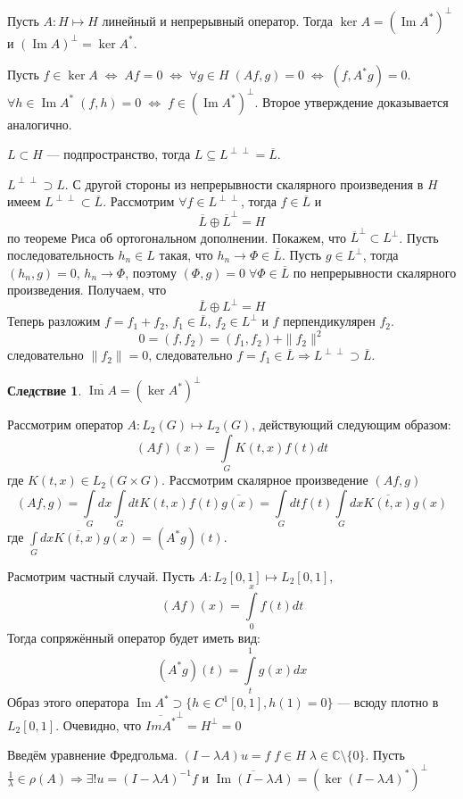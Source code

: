 \documentclass[12pt]{article}
\renewcommand{\Im}{\operatorname{Im}}
\begin{document}
\begin{Theor}[Фредгольма]
    Пусть $A : H \mapsto H$ линейный и непрерывный оператор. Тогда $\ker A = (\Im A^*)^\perp$ и $(\Im A)^\perp = \ker A^*$.
\end{Theor}
\begin{Proof}
Пусть $f \in \ker A\;\Leftrightarrow\;Af = 0\;\Leftrightarrow\;\forall g \in H\;(Af, g) = 0\;\Leftrightarrow\;(f, A^* g) = 0$.
$\forall h \in \Im A^*\;(f, h) = 0\;\Leftrightarrow\;f \in (\Im A^*)^\perp$. Второе утверждение доказывается аналогично.
\end{Proof}

\begin{Utv}
$L \subset H$ --- подпространство, тогда $L \subseteq L^{\perp\perp} = \overline{L}$.
\end{Utv}

\begin{Proof}
    $L^{\perp\perp} \supset L$.
    С другой стороны из непрерывности скалярного произведения в $H$ имеем
    $L^{\perp\perp} \subset \overline{L}$.
    Рассмотрим $\forall f \in L^{\perp\perp}$, тогда $f \in \overline{L}$ и 
    $$
    \overline{L} \oplus \overline{L}^{\perp} = H
    $$ по теореме Риса об ортогональном дополнении.
    Покажем, что $\overline{L}^{\perp} \subset L^{\perp}$.
    Пусть последовательность $h_n \in L$ такая, что $h_n \to \Phi \in \overline{L}$.
    Пусть $g \in L^{\perp}$, тогда $(h_n, g) = 0$, $h_n \to \Phi$, поэтому $(\Phi, g) = 0\;\forall \Phi \in \overline{L}$ по непрерывности скалярного произведения.
    Получаем, что
    $$
    \overline{L} \oplus L^{\perp} = H
    $$
    Теперь разложим $f = f_1 + f_2$, $f_1 \in \overline{L}$, $f_2 \in L^{\perp}$ и $f$ перпендикулярен $f_2$.
    $$
    0 = (f, f_2) = (f_1, f_2) + \|f_2\|^2
    $$
    следовательно $\|f_2\| = 0$, следовательно $f = f_1 \in \overline{L} \Rightarrow L^{\perp\perp} \supset \overline{L}$.
\end{Proof}
\newtheorem{Sled2}{Следствие}
\begin{Sled2}
    $\overline{\Im A} = (\ker A^*)^\perp$
\end{Sled2}

\begin{Prim}
	Рассмотрим оператор $A : L_2(G) \mapsto L_2(G)$, действующий следующим
	образом:
	$$
	(Af)(x) = \int \limits_G K(t, x) f(t) dt
	$$
	где $K(t, x) \in L_2(G \times G)$.
	Рассмотрим скалярное произведение $(Af, g)$
	$$
	(Af, g) = \int \limits_G dx \int \limits_G dt K(t, x) f(t) \overline{g(x)}=
	\int \limits_G dt f(t) \int \limits_G dx \overline{K(t, x)} g(x)
	$$
	где $\int \limits_G dx \overline{K(t, x)} g(x) = (A^* g)(t)$.
	
	Расмотрим частный случай.
	Пусть $A:L_2[0,1] \mapsto L_2[0,1]$,
	$$
	(A f)(x) = \int \limits_0^x f(t) dt
	$$
	Тогда сопряжённый оператор будет иметь вид:
	$$
	(A^*g)(t) = \int \limits_t^1 g(x) dx
	$$
	Образ этого оператора $\Im A^* \supset \{h\in C^1[0,1], h(1) = 0\}$ --- всюду
	плотно в $L_2[0,1]$.
	Очевидно, что $\overline{Im A^*}^\perp = H^\perp = 0$
\end{Prim}

Введём уравнение Фредгольма.
$(I - \lambda A) u = f\;f\in H\;\lambda \in \mathbb C \setminus\{0\}$.
Пусть $\frac{1}{\lambda} \in \rho(A) \Rightarrow \exists! u = (I - \lambda A)^{-1}f$ 
и $\overline{\Im(I - \lambda A)} = (\ker(I - \lambda A)^*)^\perp$
\end{document}
